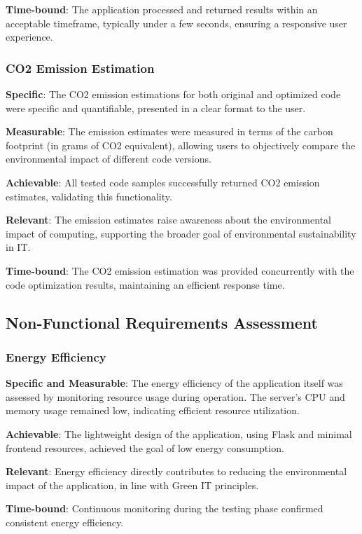 \documentclass[conference,compsoc]{IEEEtran}
\begin{document}
\textbf{Time-bound}: The application processed and returned results within an acceptable timeframe, typically under a few seconds, ensuring a responsive user experience.

\subsubsection{CO2 Emission Estimation}
\textbf{Specific}: The CO2 emission estimations for both original and optimized code were specific and quantifiable, presented in a clear format to the user.

\textbf{Measurable}: The emission estimates were measured in terms of the carbon footprint (in grams of CO2 equivalent), allowing users to objectively compare the environmental impact of different code versions.

\textbf{Achievable}: All tested code samples successfully returned CO2 emission estimates, validating this functionality.

\textbf{Relevant}: The emission estimates raise awareness about the environmental impact of computing, supporting the broader goal of environmental sustainability in IT.

\textbf{Time-bound}: The CO2 emission estimation was provided concurrently with the code optimization results, maintaining an efficient response time.

\subsection{Non-Functional Requirements Assessment}
\subsubsection{Energy Efficiency}
\textbf{Specific and Measurable}: The energy efficiency of the application itself was assessed by monitoring resource usage during operation. The server's CPU and memory usage remained low, indicating efficient resource utilization.

\textbf{Achievable}: The lightweight design of the application, using Flask and minimal frontend resources, achieved the goal of low energy consumption.

\textbf{Relevant}: Energy efficiency directly contributes to reducing the environmental impact of the application, in line with Green IT principles.

\textbf{Time-bound}: Continuous monitoring during the testing phase confirmed consistent energy efficiency.
\end{document}
